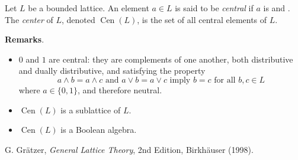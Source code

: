 \documentclass[12pt]{article}
\begin{document}

Let $L$ be a bounded lattice.  An element $a\in L$ is said to be \emph{central} if $a$ is  and .  The \emph{center} of $L$, denoted $\operatorname{Cen}(L)$, is the set of all central elements of $L$.

\textbf{Remarks}.
\begin{itemize}
\item $0$ and $1$ are central: they are complements of one another, both distributive and dually distributive, and satisfying the property $$a\wedge b=a\wedge c\mbox{ and }a\vee b=a\vee c\mbox{ imply }b=c\mbox{ for all }b,c\in L$$ where $a\in \lbrace 0,1\rbrace$, and therefore neutral.
\item $\operatorname{Cen}(L)$ is a sublattice of $L$.
\item $\operatorname{Cen}(L)$ is a Boolean algebra.
\end{itemize}

\begin{thebibliography}{8}
 G. Gr\"{a}tzer, {\em General Lattice Theory}, 2nd Edition, Birkh\"{a}user (1998).
\end{thebibliography}
\end{document}
